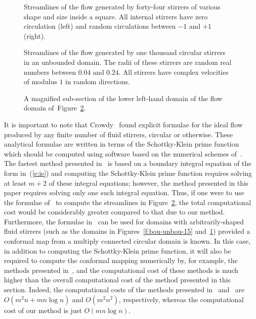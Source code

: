 \documentclass[11pt,a4paper]{article}
\begin{document}
\begin{figure} %
\centerline{
\hfill
{}
}
\caption{Streamlines of the flow generated by forty-four stirrers of various shape and size inside a square. All internal stirrers have zero circulation (left) and random circulations between $-1$ and $+1$ (right).} 
\label{f:Squares-44}
\end{figure}


\begin{figure} %
\centerline{}
\caption{Streamlines of the flow generated by one thousand circular stirrers in an unbounded domain. The radii of these stirrers are random real numbers between $0.04$ and $0.24$. All stirrers have complex velocities of modulus $1$ in random directions.} 
\label{f:disks-1000}
\end{figure}

\begin{figure} %
\centerline{}
\caption{A magnified sub-section of the lower left-hand domain of the flow domain of~Figure~\ref{f:disks-1000}.} 
\label{f:disks-1000z}
\end{figure}

It is important to note that Crowdy~\cite{cro-str} found explicit formulae for the ideal flow produced by any finite number of fluid stirrers, circular or otherwise. These analytical formulae are written in terms of the Schottky-Klein prime function which should be computed using software based on the numerical schemes of~\cite{skpf}. The fastest method presented in~\cite{skpf} is based on a boundary integral equation of the form in~(\ref{e:ie}) and computing the Schottky-Klein prime function requires solving at least $m+2$ of these integral equations; however, the method presented in this paper requires solving only one such integral equation. Thus, if one were to use the formulae of~\cite{cro-str} to compute the streamlines in Figure~\ref{f:disks-1000}, the total computational cost would be considerably greater compared to that due to our method. Furthermore, the formulae in~\cite{cro-str} can be used for domains with arbitrarily-shaped fluid stirrers (such as the domains in Figures~\ref{f:bou-unbou-15} and~\ref{f:Squares-44}) provided a conformal map from a multiply connected circular domain is known. In this case, in addition to computing the Schottky-Klein prime function, it will also be required to compute the conformal mapping numerically by, for example, the methods presented in~\cite{NAS-CMFT15,weg-fast}, and the computational cost of these methods is much higher than the overall computational cost of the method presented in this section. Indeed, the computational costs of the methods presented in~\cite{NAS-CMFT15} and~\cite{weg-fast} are $O(m^2n+mn\log n)$ and $O(m^2n^2)$, respectively, whereas the computational cost of our method is just $O(mn\log n)$. 
\end{document}
